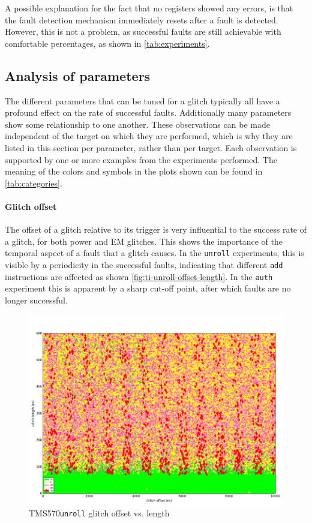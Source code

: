 \documentclass[10pt]{article}
\newcommand{\TI}{TMS570\xspace}
\newcommand{\unroll}{\texttt{unroll}\xspace}
\newcommand{\auth}{\texttt{auth}\xspace}
\begin{document}
        A possible explanation for the fact that no registers showed any errors, is that the fault detection mechanism immediately resets after a fault is detected. However, this is not a problem, as successful faults are still achievable with comfortable percentages, as shown in \autoref{tab:experiments}.

  \subsection{Analysis of parameters }
  \label{sec:characterization-observations}
    The different parameters that can be tuned for a glitch typically all have a profound effect on the rate 
    of successful faults. Additionally many parameters show some relationship to one another. These observations can be made independent of the target on which they are performed, which is why they are listed in this section per parameter, rather than per target. Each observation is supported by one or more examples from the experiments performed. The meaning of the colors and symbols in the plots shown can be found in \autoref{tab:categories}. 

    \paragraph*{Glitch offset }
        The offset of a glitch relative to its trigger is very influential to the success rate of a glitch, for both power and EM glitches. This shows the importance of the temporal aspect of a fault that a glitch causes. In the \unroll experiments, this is visible by a periodicity in the successful faults, indicating that different \texttt{add} instructions are affected as shown \autoref{fig:ti-unroll-offset-length}. In the \auth experiment this is apparent by a sharp cut-off point, after which faults are no longer successful.

        \begin{figure}[H]
          \centering
          \includegraphics[width=\textwidth]{../plots/newplots/ti-unroll-offset-length.png}
          \caption{\TI \unroll glitch offset vs. length}
          \label{fig:ti-unroll-offset-length}
        \end{figure}
\end{document}
